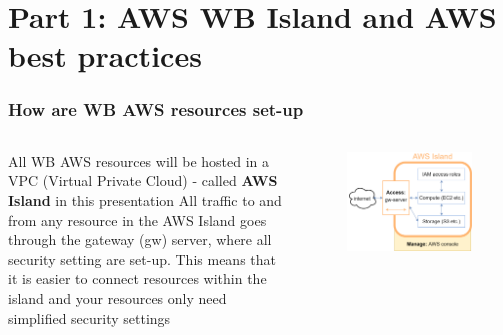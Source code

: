 \documentclass[aspectratio=169]{beamer} %
\begin{document}
\section{Part 1: AWS WB Island and AWS best practices}

\begin{frame}
\frametitle{How are WB AWS resources set-up}

	\begin{columns}[c]
		\large All WB AWS resources will be hosted in a
		VPC (Virtual Private Cloud) - 
		called \textbf{AWS Island} in this presentation
		\vspace{.3cm}\newline
		\large All traffic to and from any resource in
		the AWS Island goes through the gateway (gw) server,
		where all security setting are set-up.
		\vspace{.3cm}\newline
		\large This means that 
		it is easier to connect resources within the island and
		your resources only need simplified security settings

		\begin{figure}
			\centering
			\includegraphics[width=\textwidth]{./img/wb-aws.png}
		\end{figure}

	\end{columns}
\end{frame}
\end{document}
